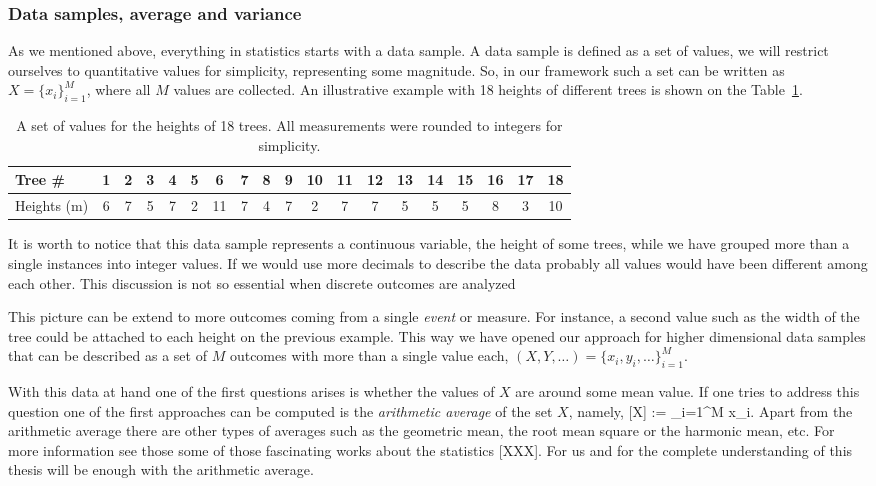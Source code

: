 \subsubsection{Data samples, average and variance}

As we mentioned above, everything in statistics starts with a data sample.
A data sample is defined as a set of values, we will restrict ourselves to quantitative values for simplicity, representing some magnitude.
So, in our framework such a set can be written as $X=\{x_i\}_{i=1}^M$, where all $M$ values are collected.
An illustrative example with 18 heights of different trees is shown on the Table~\ref{tab:bg-18-trees}.
\begin{table}
  \begin{center}
    \begin{tabular}{| l | c | c | c | c | c | c | c | c | c | c | c | c | c | c | c | c | c | c | }
      \hline
      Tree \# & 1 & 2 & 3 & 4 & 5 & 6 & 7 & 8 & 9 & 10 &  11 &  12 &  13 &  14 &  15 &  16 &  17 &  18
      \\ \hline
      Heights (m) & 6 &  7 &  5 &  7 &  2 & 11 &  7 &  4 &  7 &  2 &  7 &  7 &  5 &  5 &  5 &  8 &  3 & 10 \\ \hline
    \end{tabular}
  \end{center}
  \caption[Sample data of heights for trees]{A set of values for the heights of 18 trees. All measurements were rounded to integers for simplicity.}
  \label{tab:bg-18-trees}
\end{table}
It is worth to notice that this data sample represents a continuous variable, the height of some trees, while we have grouped more than a single instances into integer values.
If we would use more decimals to describe the data probably all values would have been different among each other.
This discussion is not so essential when discrete outcomes are analyzed

This picture can be extend to more outcomes coming from a single \emph{event} or measure.
For instance, a second value such as the width of the tree could be attached to each height on the previous example.
This way we have opened our approach for higher dimensional data samples that can be described as a set of $M$ outcomes with more than a single value each, $(X,Y,\dots)=\{x_i,y_i,\dots\}_{i=1}^M$.


With this data at hand one of the first questions arises is whether the values of $X$ are around some mean value.
If one tries to address this question one of the first approaches can be computed is the \emph{arithmetic average} of the set $X$, namely,
\be
  [X] := \sum_{i=1}^M x_i.
\ee
Apart from the arithmetic average there are other types of averages such as the geometric mean, the root mean square or the harmonic mean, etc.
For more information see those some of those fascinating works about the statistics [XXX].
For us and for the complete understanding of this thesis will be enough with the arithmetic average.


